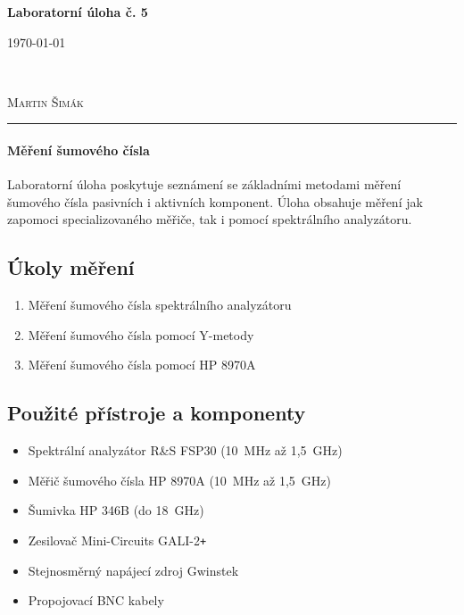 \documentclass[11pt,a4paper]{article}
\newcommand{\plus}{{\texttt{+}}}
\begin{document}

\begin{center}
    {\LARGE\textbf{Laboratorní úloha č. 5}}\\[3mm]
    \begin{minipage}{0.4\textwidth}
        \begin{flushleft}
            \textsc{\today}
        \end{flushleft}
    \end{minipage}
    ~
    \begin{minipage}{0.4\textwidth}
        \begin{flushright}
            \textsc{Martin Šimák}
        \end{flushright}
    \end{minipage}
    \noindent\rule{14.5cm}{0.4pt}
\end{center}

\paragraph*{Měření šumového čísla} Laboratorní úloha poskytuje seznámení se základními metodami měření šumového čísla pasivních i aktivních komponent. Úloha obsahuje měření jak zapomoci specializovaného měřiče, tak i pomocí spektrálního analyzátoru.

\subsection*{Úkoly měření}
\begin{enumerate}
    \item Měření šumového čísla spektrálního analyzátoru
    \item Měření šumového čísla pomocí Y-metody
    \item Měření šumového čísla pomocí HP 8970A
\end{enumerate}

\subsection*{Použité přístroje a komponenty}
\begin{itemize}
    \item Spektrální analyzátor R\&S FSP30 (10~MHz až 1,5~GHz)
    \item Měřič šumového čísla HP 8970A (10~MHz až 1,5~GHz)
    \item Šumivka HP 346B (do 18~GHz)
    \item Zesilovač Mini-Circuits GALI-2\plus
    \item Stejnosměrný napájecí zdroj Gwinstek
    \item Propojovací BNC kabely
\end{itemize}
\end{document}

